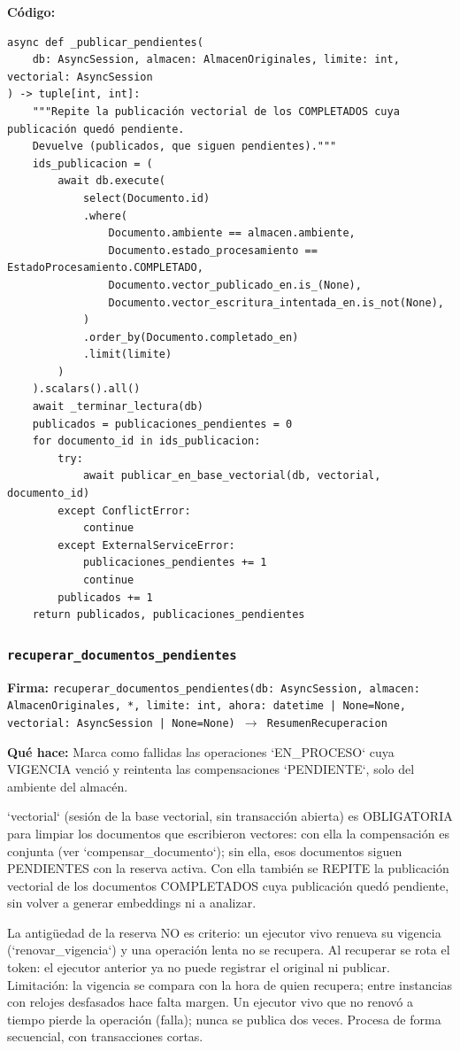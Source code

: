 \documentclass[11pt,a4paper]{article}
\begin{document}
\textbf{Código:}
\begin{lstlisting}
async def _publicar_pendientes(
    db: AsyncSession, almacen: AlmacenOriginales, limite: int, vectorial: AsyncSession
) -> tuple[int, int]:
    """Repite la publicación vectorial de los COMPLETADOS cuya publicación quedó pendiente.
    Devuelve (publicados, que siguen pendientes)."""
    ids_publicacion = (
        await db.execute(
            select(Documento.id)
            .where(
                Documento.ambiente == almacen.ambiente,
                Documento.estado_procesamiento == EstadoProcesamiento.COMPLETADO,
                Documento.vector_publicado_en.is_(None),
                Documento.vector_escritura_intentada_en.is_not(None),
            )
            .order_by(Documento.completado_en)
            .limit(limite)
        )
    ).scalars().all()
    await _terminar_lectura(db)
    publicados = publicaciones_pendientes = 0
    for documento_id in ids_publicacion:
        try:
            await publicar_en_base_vectorial(db, vectorial, documento_id)
        except ConflictError:
            continue
        except ExternalServiceError:
            publicaciones_pendientes += 1
            continue
        publicados += 1
    return publicados, publicaciones_pendientes
\end{lstlisting}

\subsubsection*{\texttt{recuperar\_documentos\_pendientes}}
\textbf{Firma:} \texttt{recuperar\_documentos\_pendientes(db: AsyncSession, almacen: AlmacenOriginales, *, limite: int, ahora: datetime | None=None, vectorial: AsyncSession | None=None) $\rightarrow$ ResumenRecuperacion}

\textbf{Qué hace:} Marca como fallidas las operaciones `EN\_PROCESO` cuya VIGENCIA venció y reintenta las
compensaciones `PENDIENTE`, solo del ambiente del almacén.

`vectorial` (sesión de la base vectorial, sin transacción abierta) es OBLIGATORIA para limpiar los
documentos que escribieron vectores: con ella la compensación es conjunta (ver `compensar\_documento`);
sin ella, esos documentos siguen PENDIENTES con la reserva activa. Con ella también se REPITE la
publicación vectorial de los documentos COMPLETADOS cuya publicación quedó pendiente, sin volver a
generar embeddings ni a analizar.

La antigüedad de la reserva NO es criterio: un ejecutor vivo renueva su vigencia
(`renovar\_vigencia`) y una operación lenta no se recupera. Al recuperar se rota el
token: el ejecutor anterior ya no puede registrar el original ni publicar. Limitación:
la vigencia se compara con la hora de quien recupera; entre instancias con relojes
desfasados hace falta margen. Un ejecutor vivo que no renovó a tiempo pierde la operación
(falla); nunca se publica dos veces. Procesa de forma secuencial, con transacciones cortas.
\end{document}
